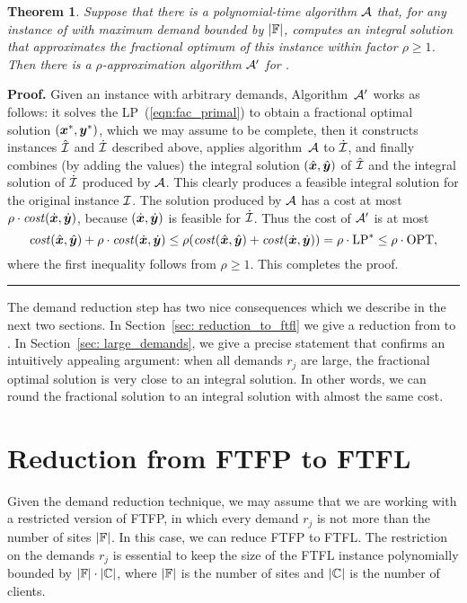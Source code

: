 \documentclass[oneside,final]{ucr}
\newtheorem{theorem}{Theorem}
\newenvironment{proof}[1][Proof]{\textbf{#1.} }{\ \rule{0.5em}{0.5em}}
\begin{document}

\begin{theorem}\label{thm: reduction to polynomial}
  Suppose that there is a polynomial-time algorithm $\calA$
  that, for any instance of {\FTFP} with maximum demand
  bounded by $|\mathbb{F}|$, computes an integral solution
  that approximates the fractional optimum of this instance
  within factor $\rho\geq 1$.  Then there is a
  $\rho$-approximation algorithm $\calA'$ for {\FTFP}.
\end{theorem}
\begin{proof}
  Given an {\FTFP} instance with arbitrary demands,
  Algorithm~$\calA'$ works as follows: it solves the
  LP~(\ref{eqn:fac_primal}) to obtain a fractional optimal
  solution $(\boldsymbol{x}^\ast,\boldsymbol{y}^\ast)$, which we may assume to
  be complete, then it constructs instances $\hatcalI$ and
  $\dotcalI$ described above, applies algorithm~$\calA$ to
  $\dotcalI$, and finally combines (by adding the values)
  the integral solution $(\hat{\boldsymbol{x}}, \hat{\boldsymbol{y}})$ of $\hatcalI$
  and the integral solution of $\dotcalI$ produced by
  $\calA$. This clearly produces a feasible integral
  solution for the original instance $\mathcal{I}$.  The solution
  produced by $\calA$ has a cost at most
  $\rho\cdot{\it cost}(\dot{\boldsymbol{x}},\dot{\boldsymbol{y}})$, because
  $(\dot{\boldsymbol{x}},\dot{\boldsymbol{y}})$ is feasible for $\dotcalI$. Thus the
  cost of $\calA'$ is at most
% 
\begin{equation*}
 {\it cost}(\hat{\boldsymbol{x}}, \hat{\boldsymbol{y}}) + \rho\cdot{\it cost}(\dot{\boldsymbol{x}},\dot{\boldsymbol{y}})
	\le
 \rho({\it cost}(\hat{\boldsymbol{x}}, \hat{\boldsymbol{y}}) + {\it cost}(\dot{\boldsymbol{x}},\dot{\boldsymbol{y}}))
		= \rho\cdot\mbox{\rm LP}^\ast \le \rho\cdot\mbox{\rm OPT},
\end{equation*}
%
where the first inequality follows from $\rho\geq 1$. This completes
the proof.
\end{proof}

The demand reduction step has two nice consequences which we
describe in the next two sections. In Section~\ref{sec:
  reduction_to_ftfl} we give a reduction from {\FTFP} to
{\FTFL}. In Section~\ref{sec: large_demands}, we give a
precise statement that confirms an intuitively appealing
argument: when all demands $r_j$ are large, the fractional
optimal solution is very close to an integral solution. In
other words, we can round the fractional solution to an
integral solution with almost the same cost.


\section{Reduction from FTFP to FTFL}
\label{sec: reduction_to_ftfl}
Given the demand reduction technique, we may assume that we
are working with a restricted version of FTFP, in which
every demand $r_j$ is not more than the number of sites
$|\mathbb{F}|$. In this case, we can reduce FTFP to FTFL. The
restriction on the demands $r_j$ is essential to keep the
size of the FTFL instance polynomially bounded by
$|\mathbb{F}|\cdot |\mathbb{C}|$, where $|\mathbb{F}|$ is the
number of sites and $|\mathbb{C}|$ is the number of clients.
\end{document}
